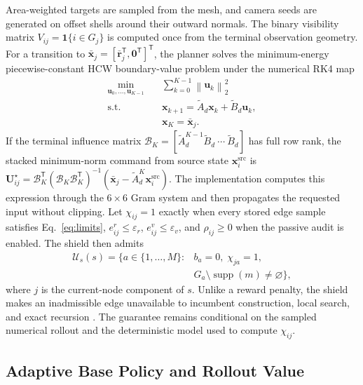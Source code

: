\documentclass{IEEEtaes}
\newcommand{\norm}[1]{\left\lVert #1 \right\rVert}
\theoremstyle{remark}
\theoremstyle{plain}
\begin{document}
Area-weighted targets are sampled from the mesh, and camera seeds are generated on offset shells around their outward normals. The binary visibility matrix $V_{ij}=\mathbf 1\{i\in G_j\}$ is computed once from the terminal observation geometry. For a transition to $\bar{\mathbf x}_j=[\bar{\mathbf r}_j^{\mathsf T},\mathbf0^{\mathsf T}]^{\mathsf T}$, the planner solves the minimum-energy piecewise-constant HCW boundary-value problem under the numerical RK4 map
\begin{equation}
  \begin{aligned}
  \min_{\mathbf u_0,\ldots,\mathbf u_{K-1}}\quad&
  \sum_{k=0}^{K-1}\norm{\mathbf u_k}_2^2\\
  \mathrm{s.t.}\quad&
  \mathbf x_{k+1}=\widetilde A_d\mathbf x_k+\widetilde B_d\mathbf u_k,\\
  &\mathbf x_K=\bar{\mathbf x}_j.
  \end{aligned}
  \label{eq:terminal-transfer}
\end{equation}
If the terminal influence matrix $\mathcal B_K=[\widetilde A_d^{K-1}\widetilde B_d\ \cdots\ \widetilde B_d]$ has full row rank, the stacked minimum-norm command from source state $\mathbf x_i^{\mathrm{src}}$ is $\mathbf U_{ij}^\star=\mathcal B_K^{\mathsf T}(\mathcal B_K\mathcal B_K^{\mathsf T})^{-1}(\bar{\mathbf x}_j-\widetilde A_d^K\mathbf x_i^{\mathrm{src}})$. The implementation computes this expression through the $6\times6$ Gram system and then propagates the requested input without clipping. Let $\chi_{ij}=1$ exactly when every stored edge sample satisfies Eq.~\eqref{eq:limits}, $e_{ij}^{r}\le\varepsilon_r$, $e_{ij}^{v}\le\varepsilon_v$, and $\rho_{ij}\ge0$ when the passive audit is enabled. The shield then admits
\begin{equation}
  \begin{split}
  \mathcal U_s(s)=\{a\in\{1,\ldots,M\}:{}& b_a=0,\;\chi_{ja}=1,\\
    &G_a\setminus\operatorname{supp}(m)\neq\varnothing\},
  \end{split}
  \label{eq:safe-action-set}
\end{equation}
where $j$ is the current-node component of $s$. Unlike a reward penalty, the shield makes an inadmissible edge unavailable to incumbent construction, local search, and exact recursion \cite{alshiekh2018shielding}. The guarantee remains conditional on the sampled numerical rollout and the deterministic model used to compute $\chi_{ij}$.

\subsection{Adaptive Base Policy and Rollout Value}
\end{document}
